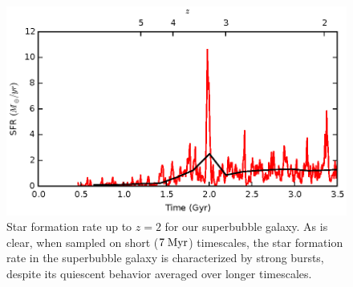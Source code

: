 \begin{figure}
    \includegraphics[width=\textwidth]{figures2/burstiness.eps}
    \caption[Superbubble star formation burstiness]{Star formation rate up to
    $z=2$ for our superbubble galaxy.  As is clear, when sampled on short ($7\;
    \rm{Myr}$) timescales, the star formation rate in the superbubble galaxy is
    characterized by strong bursts, despite its quiescent behavior averaged over
    longer timescales.}
    \label{burstiness}
\end{figure}
